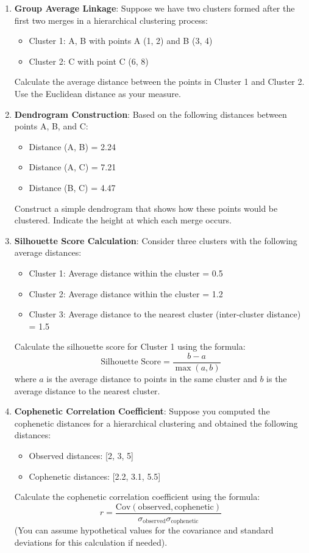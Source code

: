 \documentclass{article}
\begin{document}
\begin{enumerate}[1.]
    \item \textbf{Group Average Linkage}:  
    Suppose we have two clusters formed after the first two merges in a hierarchical clustering process:
    \begin{itemize}
        \item Cluster 1: {A, B} with points A (1, 2) and B (3, 4)  
        \item Cluster 2: {C} with point C (6, 8)
    \end{itemize}
    Calculate the average distance between the points in Cluster 1 and Cluster 2.  
    Use the Euclidean distance as your measure.

    \item \textbf{Dendrogram Construction}:  
    Based on the following distances between points A, B, and C:
    \begin{itemize}
        \item Distance (A, B) = 2.24  
        \item Distance (A, C) = 7.21  
        \item Distance (B, C) = 4.47  
    \end{itemize}
    Construct a simple dendrogram that shows how these points would be clustered.  
    Indicate the height at which each merge occurs.

    \item \textbf{Silhouette Score Calculation}:  
    Consider three clusters with the following average distances:
    \begin{itemize}
        \item Cluster 1: Average distance within the cluster = 0.5  
        \item Cluster 2: Average distance within the cluster = 1.2  
        \item Cluster 3: Average distance to the nearest cluster (inter-cluster distance) = 1.5
    \end{itemize}
    Calculate the silhouette score for Cluster 1 using the formula:
    \[
    \text{Silhouette Score} = \frac{b - a}{\max(a, b)}
    \]
    where \( a \) is the average distance to points in the same cluster and \( b \) is the average distance to the nearest cluster.

    \item \textbf{Cophenetic Correlation Coefficient}:  
    Suppose you computed the cophenetic distances for a hierarchical clustering and obtained the following distances:
    \begin{itemize}
        \item Observed distances: [2, 3, 5]  
        \item Cophenetic distances: [2.2, 3.1, 5.5]  
    \end{itemize}
    Calculate the cophenetic correlation coefficient using the formula:
    \[
    r = \frac{\text{Cov}(\text{observed}, \text{cophenetic})}{\sigma_{\text{observed}} \sigma_{\text{cophenetic}}}
    \]
    (You can assume hypothetical values for the covariance and standard deviations for this calculation if needed).


\end{enumerate}
\end{document}
